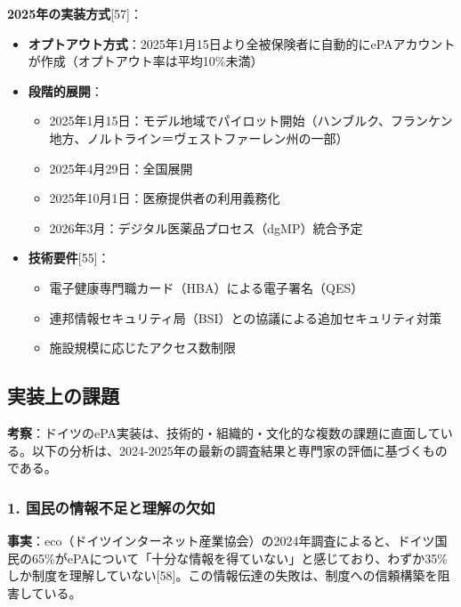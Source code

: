 \documentclass[
  a4paper,
  a4paper,
  11pt]{ltjsbook}
\providecommand{\tightlist}{%
  \setlength{\itemsep}{0pt}\setlength{\parskip}{0pt}}
\begin{document}
\begin{tcolorbox}
\textbf{2025年の実装方式}{[}57{]}：

\begin{itemize}
\item
  \textbf{オプトアウト方式}：2025年1月15日より全被保険者に自動的にePAアカウントが作成（オプトアウト率は平均10\%未満）
\item
  \textbf{段階的展開}：

  \begin{itemize}
  \tightlist
  \item
    2025年1月15日：モデル地域でパイロット開始（ハンブルク、フランケン地方、ノルトライン＝ヴェストファーレン州の一部）
  \item
    2025年4月29日：全国展開
  \item
    2025年10月1日：医療提供者の利用義務化
  \item
    2026年3月：デジタル医薬品プロセス（dgMP）統合予定
  \end{itemize}
\item
  \textbf{技術要件}{[}55{]}：

  \begin{itemize}
  \tightlist
  \item
    電子健康専門職カード（HBA）による電子署名（QES）
  \item
    連邦情報セキュリティ局（BSI）との協議による追加セキュリティ対策
  \item
    施設規模に応じたアクセス数制限
  \end{itemize}
\end{itemize}

\end{tcolorbox}

\subsection{実装上の課題}\label{ux5b9fux88c5ux4e0aux306eux8ab2ux984c}

\textbf{考察}：ドイツのePA実装は、技術的・組織的・文化的な複数の課題に直面している。以下の分析は、2024-2025年の最新の調査結果と専門家の評価に基づくものである。

\subsubsection{1.
国民の情報不足と理解の欠如}\label{ux56fdux6c11ux306eux60c5ux5831ux4e0dux8db3ux3068ux7406ux89e3ux306eux6b20ux5982}

\textbf{事実}：eco（ドイツインターネット産業協会）の2024年調査によると、ドイツ国民の65\%がePAについて「十分な情報を得ていない」と感じており、わずか35\%しか制度を理解していない{[}58{]}。この情報伝達の失敗は、制度への信頼構築を阻害している。
\end{document}
